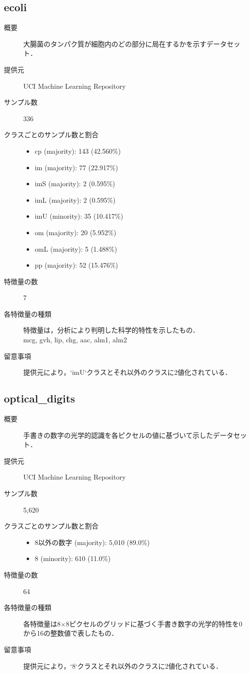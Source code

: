 \subsection{ecoli}
\begin{description}
    \item[概要] 大腸菌のタンパク質が細胞内のどの部分に局在するかを示すデータセット． \cite{ecoli}
    \item[提供元] UCI Machine Learning Repository
    \item[サンプル数] 336
    \item[クラスごとのサンプル数と割合] \mbox{}
        \begin{itemize}
            \item cp (majority): 143 (42.560\%)
            \item im (majority): 77 (22.917\%)
            \item imS (majority): 2 (0.595\%)
            \item imL (majority): 2 (0.595\%)
            \item imU (minority): 35 (10.417\%)
            \item om (majority): 20 (5.952\%)
            \item omL (majority): 5 (1.488\%)
            \item pp (majority): 52 (15.476\%)
        \end{itemize}
    \item[特徴量の数] 7
    \item[各特徴量の種類] 特徴量は，分析により判明した科学的特性を示したもの．\\
            mcg, gvh, lip, chg, aac, alm1, alm2
    \item[留意事項] 提供元により，`imU`クラスとそれ以外のクラスに2値化されている．
\end{description}

\subsection{optical\_digits}
    \begin{description}
    \item[概要] 手書きの数字の光学的認識を各ピクセルの値に基づいて示したデータセット．\cite{optical_digits}
    \item[提供元] UCI Machine Learning Repository
    \item[サンプル数] 5,620
    \item[クラスごとのサンプル数と割合] \mbox{}
        \begin{itemize}
            \item 8以外の数字 (majority): 5,010 (89.0\%)
            \item 8 (minority): 610 (11.0\%)
        \end{itemize}
    \item[特徴量の数] 64
    \item[各特徴量の種類] \mbox{}
        各特徴量は8$\times$8ピクセルのグリッドに基づく手書き数字の光学的特性を0から16の整数値で表したもの．
    \item[留意事項] 提供元により，`8`クラスとそれ以外のクラスに2値化されている．
    \end{description}

